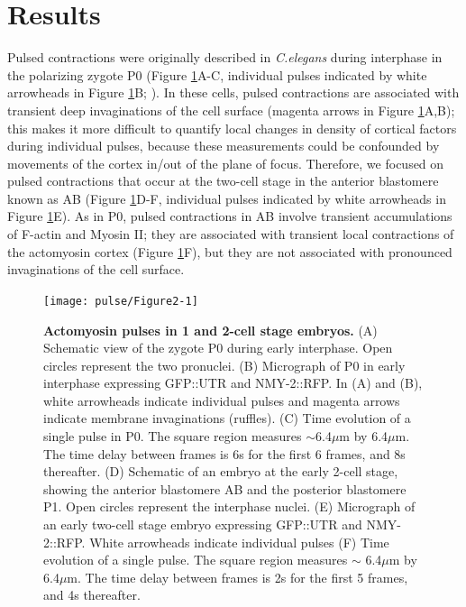 \section{Results}
Pulsed contractions were originally described in \textit{C.elegans} during interphase in the polarizing zygote P0 (Figure \ref{fig:221}A-C, individual pulses indicated by white arrowheads in Figure \ref{fig:221}B; \cite{Munro:2004jk}). In these cells, pulsed contractions are associated with transient deep invaginations of the cell surface (magenta arrows in Figure \ref{fig:221}A,B); this makes it more difficult to quantify local changes in density of cortical factors during individual pulses, because these measurements could be confounded by movements of the cortex in/out of the plane of focus. Therefore, we focused on pulsed contractions that occur at the two-cell stage in the anterior blastomere known as AB (Figure \ref{fig:221}D-F, individual pulses indicated by white arrowheads in Figure \ref{fig:221}E).  As in P0, pulsed contractions in AB involve transient accumulations of F-actin and Myosin II; they are associated with transient local contractions of the actomyosin cortex (Figure \ref{fig:221}F), but they are not associated with pronounced invaginations of the cell surface. 

\begin{figure}[!htbp]
\centering
\texttt{[image: pulse/Figure2-1]}
\caption{\label{fig:221} \textbf{Actomyosin pulses in 1 and 2-cell stage embryos.} (A) Schematic view of the zygote P0 during early interphase.  Open circles represent the two pronuclei. (B) Micrograph of P0 in early interphase expressing GFP::UTR and NMY-2::RFP. In (A) and (B), white arrowheads indicate individual pulses and magenta arrows indicate membrane invaginations (ruffles). (C) Time evolution of a single pulse in P0. The square region measures $\sim$6.4$\mu$m by 6.4$\mu$m.  The time delay between frames is 6s for the first 6 frames, and 8s thereafter. (D) Schematic of an embryo at the early 2-cell stage, showing the anterior blastomere AB and the posterior blastomere P1.  Open circles represent the interphase nuclei. (E) Micrograph of an early two-cell stage embryo expressing GFP::UTR and NMY-2::RFP. White arrowheads indicate individual pulses (F) Time evolution of a single pulse. The square region measures $\sim$ 6.4$\mu$m by 6.4$\mu$m.  The time delay between frames is 2s for the first 5 frames, and 4s thereafter.}
\end{figure}


